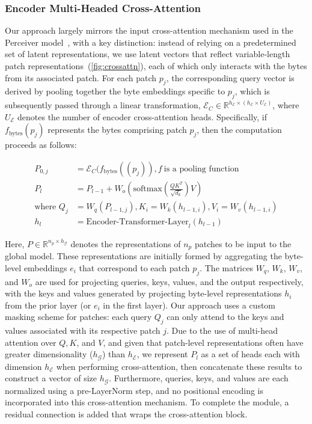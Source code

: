 \subsubsection{Encoder Multi-Headed Cross-Attention}
\label{sec:enc-cross-attn}
Our approach largely mirrors the input cross-attention mechanism used in the Perceiver model~\citep{jaegle2021perceiver}, with a key distinction: instead of relying on a predetermined set of latent representations, we use latent vectors that reflect variable-length patch representations~(\autoref{fig:crossattn}), each of which only interacts with the bytes from its associated patch. For each patch $p_j$, the corresponding query vector is derived by pooling together the byte embeddings specific to $p_j$, which is subsequently passed through a linear transformation, $\mathcal{E}_{C} \in \mathbb{R}^{h_{\mathcal{E}} \times (h_{\mathcal{E}} \times U_{\mathcal{E}})}$, where $U_{\mathcal{E}}$ denotes the number of encoder cross-attention heads. Specifically, if $f_{\text{bytes}}(p_j)$ represents the bytes comprising patch $p_j$, then the computation proceeds as follows:

\begin{align}
P_{0,j} &= \mathcal{E}_{C}(f_\text{bytes}((p_j)), f~ \text{is a pooling function} \\
P_l &= P_{l-1} + W_o\left(\text{softmax}\left(\frac{QK^T}{\sqrt{d_k}}\right)V\right) \\
\text{where } Q_j &= W_q(P_{l-1,j}), K_i = W_k(h_{l-1,i}), V_i = W_v(h_{l-1,i}) \\
h_l &= \text{Encoder-Transformer-Layer}_l(h_{l-1})
\end{align}

Here, $P \in \mathbb{R}^{n_p \times h_{\mathcal{G}}}$ denotes the representations of $n_p$ patches to be input to the global model. These representations are initially formed by aggregating the byte-level embeddings $e_i$ that correspond to each patch $p_j$. The matrices $W_q$, $W_k$, $W_v$, and $W_o$ are used for projecting queries, keys, values, and the output respectively, with the keys and values generated by projecting byte-level representations $h_i$ from the prior layer (or $e_i$ in the first layer). Our approach uses a custom masking scheme for patches: each query $Q_j$ can only attend to the keys and values associated with its respective patch $j$. Due to the use of multi-head attention over $Q, K$, and $V$, and given that patch-level representations often have greater dimensionality ($h_{\mathcal{G}}$) than $h_{\mathcal{E}}$, we represent $P_l$ as a set of heads each with dimension $h_{\mathcal{E}}$ when performing cross-attention, then concatenate these results to construct a vector of size $h_{\mathcal{G}}$. Furthermore, queries, keys, and values are each normalized using a pre-LayerNorm step, and no positional encoding is incorporated into this cross-attention mechanism. To complete the module, a residual connection is added that wraps the cross-attention block.

